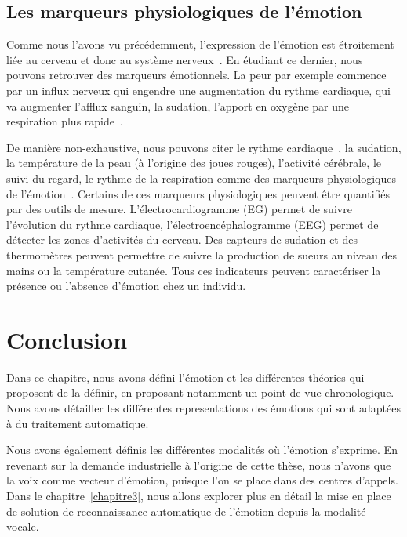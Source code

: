 \subsection{Les marqueurs physiologiques de l'émotion}
Comme nous l'avons vu précédemment, l'expression de l'émotion est étroitement liée au cerveau et donc au système nerveux~\cite{Dantzer2002}. En étudiant ce dernier, nous pouvons retrouver des marqueurs émotionnels. La peur par exemple commence par un influx nerveux qui engendre une augmentation du rythme cardiaque, qui va augmenter l'afflux sanguin, la sudation, l'apport en oxygène par une respiration plus rapide~\cite{Steimer2002}.

De manière non-exhaustive, nous pouvons citer le rythme cardiaque~\cite{Wiens2000}, la sudation, la température de la peau (à l'origine des joues rouges), l'activité cérébrale, le suivi du regard, le rythme de la respiration comme des marqueurs physiologiques de l'émotion~\cite{Maaoui2010,Levenson2003}. Certains de ces marqueurs physiologiques peuvent être quantifiés par des outils de mesure. L'électrocardiogramme (EG) permet de suivre l'évolution du rythme cardiaque, l'électroencéphalogramme (EEG) permet de détecter les zones d'activités du cerveau. Des capteurs de sudation et des thermomètres peuvent permettre de suivre la production de sueurs au niveau des mains ou la température cutanée. Tous ces indicateurs peuvent caractériser la présence ou l'absence d'émotion chez un individu.

\section{Conclusion}
Dans ce chapitre, nous avons défini l'émotion et les différentes théories qui proposent de la définir, en proposant notamment un point de vue chronologique. Nous avons détailler les différentes representations des émotions qui sont adaptées à du traitement automatique.

Nous avons également définis les différentes modalités où l'émotion s'exprime. En revenant sur la demande industrielle à l'origine de cette thèse, nous n'avons que la voix comme vecteur d'émotion, puisque l'on se place dans des centres d'appels. Dans le chapitre~\ref{chapitre3}, nous allons explorer plus en détail la mise en place de solution de reconnaissance automatique de l'émotion depuis la modalité vocale.
